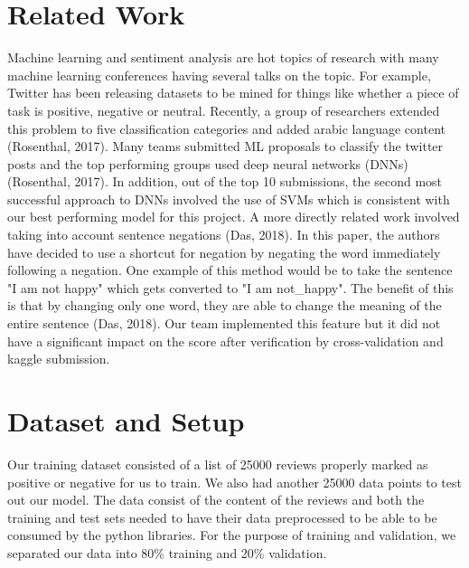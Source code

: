 \documentclass{amsart}
\theoremstyle{definition}
\theoremstyle{remark}
\numberwithin{equation}{section}
\begin{document}
\section{Related Work}
Machine learning and sentiment analysis are hot topics of research with many machine learning conferences having several talks on the topic.  For example, Twitter has been releasing datasets to be mined for things like whether a piece of task is positive, negative or neutral.  Recently, a group of researchers extended this problem to five classification categories and added arabic language content (Rosenthal, 2017).  Many teams submitted ML proposals to classify the twitter posts and the top performing groups used deep neural networks (DNNs) (Rosenthal, 2017).  In addition, out of the top 10 submissions, the second most successful approach to DNNs involved the use of SVMs which is consistent with our best performing model for this project.  A more directly related work involved taking into account sentence negations (Das, 2018).  In this paper, the authors have decided to use a shortcut for negation by negating the word immediately following a negation.  One example of this method would be to take the sentence "I am not happy" which gets converted to "I am not\_happy".  The benefit of this is that by changing only one word, they are able to change the meaning of the entire sentence (Das, 2018).  Our team implemented this feature but it did not have a significant impact on the score after verification by cross-validation and kaggle submission.
\section{Dataset and Setup}
Our training dataset consisted of a list of 25000 reviews properly marked as positive or negative for us to train.  We also had another 25000 data points to test out our model.  The data consist of the content of the reviews and both the training and test sets needed to have their data preprocessed to be able to be consumed by the python libraries.  For the purpose of training and validation, we separated our data into 80\% training and 20\% validation.
\end{document}
